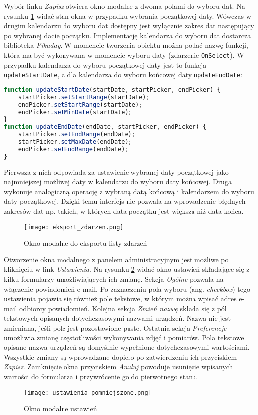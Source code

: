 \documentclass[a4paper,11pt,twoside]{article}
\begin{document}
Wybór linku \textit{Zapisz} otwiera okno modalne z dwoma polami do wyboru dat. Na rysunku \ref{fig: eksport} widać stan okna w przypadku wybrania początkowej daty. Wówczas w drugim kalendarzu do wyboru dat dostępny jest wyłącznie zakres dat następujący po wybranej dacie początku. Implementację kalendarza do wyboru dat dostarcza biblioteka \textit{Pikaday}\cite{pikaday}. W momencie tworzenia obiektu można podać nazwę funkcji, która ma być wykonywana w momencie wyboru daty (zdarzenie \texttt{OnSelect}). W przypadku kalendarza do wyboru początkowej daty jest to funkcja \texttt{updateStartDate}, a dla kalendarza do wyboru końcowej daty \texttt{updateEndDate}:
\begin{lstlisting}[language=JavaScript]
function updateStartDate(startDate, startPicker, endPicker) {
    startPicker.setStartRange(startDate);
    endPicker.setStartRange(startDate);
    endPicker.setMinDate(startDate);
}
function updateEndDate(endDate, startPicker, endPicker) {
    startPicker.setEndRange(endDate);
    startPicker.setMaxDate(endDate);
    endPicker.setEndRange(endDate);
}
\end{lstlisting}
Pierwsza z nich odpowiada za ustawienie wybranej daty początkowej jako najmniejszej możliwej daty w kalendarzu do wyboru daty końcowej. Druga wykonuje analogiczną operację z wybraną datą końcową i kalendarzem do wyboru daty początkowej. Dzięki temu interfejs nie pozwala na wprowadzenie błędnych zakresów dat np. takich, w których data początku jest większa niż data końca.
\begin{figure}[H]
\begin{center}
\texttt{[image: eksport\_zdarzen.png]}
\caption{Okno modalne do eksportu listy zdarzeń}
\label{fig: eksport}
\end{center}
\end{figure}

Otworzenie okna modalnego z panelem administracyjnym jest możliwe po kliknięciu w link \textit{Ustawienia}. Na rysunku \ref{fig: ustawienia} widać okno ustawień składające się z kilku formularzy umożliwiających ich zmianę. Sekcja \textit{Ogólne} pozwala na włączenie powiadomień e-mail. Po zaznaczeniu pola wyboru (ang. \textit{checkbox}) tego ustawienia pojawia się również pole tekstowe, w którym można wpisać adres e-mail odbiorcy powiadomień. Kolejna sekcja \textit{Zmień nazwę} składa się z pól tekstowych opisanych dotychczasowymi nazwami urządzeń. Nazwa nie jest zmieniana, jeśli pole jest pozostawione puste. Ostatnia sekcja \textit{Preferencje} umożliwia zmianę częstotliwości wykonywania zdjęć i pomiarów. Pola tekstowe opisane nazwa urządzeń są domyślnie wypełnione dotychczasowymi wartościami. Wszystkie zmiany są wprowadzane dopiero po zatwierdzeniu ich przyciskiem \textit{Zapisz}. Zamknięcie okna przyciskiem \textit{Anuluj} powoduje usunięcie wpisanych wartości do formularza i przywrócenie go do pierwotnego stanu.
\begin{figure}[H]
\begin{center}
\texttt{[image: ustawienia\_pomniejszone.png]}
\caption{Okno modalne ustawień}
\label{fig: ustawienia}
\end{center}
\end{figure}
\end{document}
